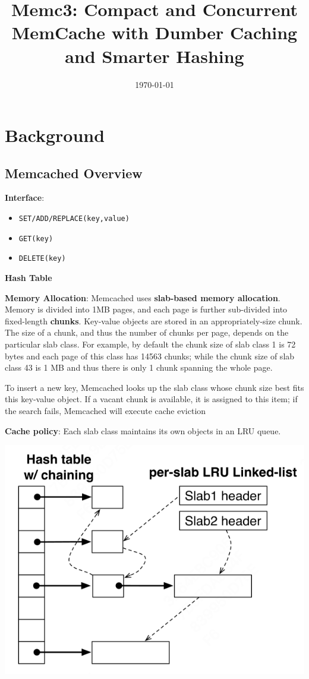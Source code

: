 \documentclass[11pt]{article}
\date{\today}
\title{Memc3: Compact and Concurrent MemCache with Dumber Caching and Smarter Hashing}
\begin{document}
\maketitle
\section{Background}
\label{sec:org52dca7c}
\subsection{Memcached Overview}
\label{sec:org52990d1}
\textbf{Interface}:
\begin{itemize}
\item \texttt{SET/ADD/REPLACE(key,value)}
\item \texttt{GET(key)}
\item \texttt{DELETE(key)}
\end{itemize}

\textbf{Hash Table}

\textbf{Memory Allocation}: Memcached uses \textbf{slab-based memory allocation}. Memory is divided into 1MB pages, and
each page is further sub-divided into fixed-length \textbf{chunks}. Key-value objects are stored in an
appropriately-size chunk. The size of a chunk, and thus the number of chunks per page, depends on the
particular slab class. For example, by default the chunk size of slab class 1 is 72 bytes and each
page of this class has 14563 chunks; while the chunk size of slab class 43 is 1 MB and thus there is
only 1 chunk spanning the whole page.

To insert a new key, Memcached looks up the slab class whose chunk size best fits this key-value
object. If a vacant chunk is available, it is assigned to this item; if the search fails, Memcached
will execute cache eviction

\textbf{Cache policy}: Each slab class maintains its own objects in an LRU queue.
\begin{center}
\includegraphics[width=.7\textwidth]{../../images/papers/174.png}
\end{center}
\end{document}
